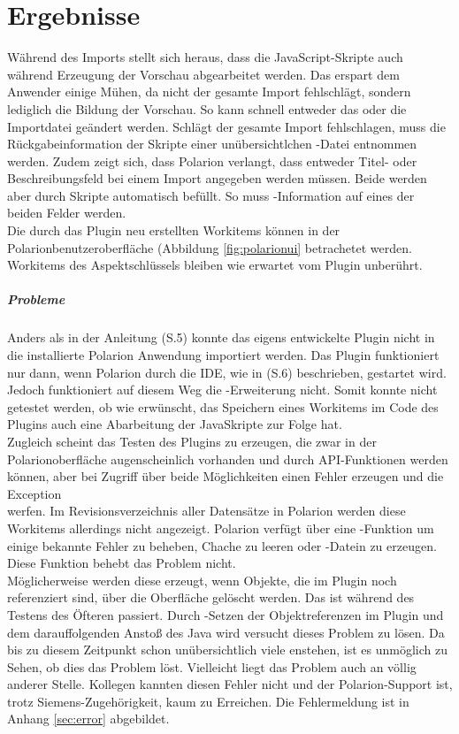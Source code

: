 \chapter{Ergebnisse}
\label{cha:erg}
Während des Imports stellt sich heraus, dass die JavaScript-Skripte auch während Erzeugung der Vorschau abgearbeitet werden. Das erspart dem Anwender einige Mühen, da nicht der gesamte Import fehlschlägt, sondern lediglich die Bildung der Vorschau. So kann schnell entweder das  oder die Importdatei geändert werden. Schlägt der gesamte Import fehlschlagen, muss die Rückgabeinformation der Skripte einer unübersichtlchen -Datei entnommen werden.  
Zudem zeigt sich, dass Polarion verlangt, dass entweder Titel- oder Beschreibungsfeld bei einem Import angegeben werden müssen. Beide werden aber durch Skripte automatisch befüllt. So muss -Information auf eines der beiden Felder  werden.\\
Die durch das Plugin neu erstellten Workitems können in der Polarionbenutzeroberfläche (Abbildung \ref{fig:polarionui} betrachetet werden. Workitems des Aspektschlüssels  bleiben wie erwartet vom Plugin unberührt.
\paragraph{Probleme}
\label{par:prob}
Anders als in der Anleitung \cite{17}(S.5) konnte das eigens entwickelte Plugin nicht in die installierte Polarion Anwendung importiert werden. Das Plugin funktioniert nur dann, wenn Polarion durch die IDE, wie in \cite{17}(S.6) beschrieben, gestartet wird. Jedoch funktioniert auf diesem Weg die -Erweiterung nicht. Somit konnte nicht getestet werden, ob wie erwünscht, das Speichern eines Workitems im Code des Plugins auch eine Abarbeitung der JavaSkripte zur Folge hat.\\
Zugleich scheint das Testen des Plugins  zu erzeugen, die zwar in der Polarionoberfläche augenscheinlich vorhanden und durch API-Funktionen  werden können, aber bei Zugriff über beide Möglichkeiten einen Fehler erzeugen und
die Exception \\  werfen. Im Revisionsverzeichnis aller Datensätze in Polarion werden diese Workitems allerdings nicht angezeigt. Polarion verfügt über eine -Funktion um einige bekannte Fehler zu beheben, Chache zu leeren oder -Datein zu erzeugen. Diese Funktion behebt das Problem nicht.\\
Möglicherweise werden diese erzeugt, wenn Objekte, die im Plugin noch referenziert sind, über die Oberfläche gelöscht werden. Das ist während des Testens des Öfteren passiert. Durch -Setzen der Objektreferenzen im Plugin und dem darauffolgenden Anstoß des Java  wird versucht dieses Problem zu lösen. Da bis zu diesem Zeitpunkt schon unübersichtlich viele  enstehen, ist es unmöglich zu Sehen, ob dies das Problem löst. Vielleicht liegt das Problem auch an völlig anderer Stelle. Kollegen kannten diesen Fehler nicht und der Polarion-Support ist, trotz Siemens-Zugehörigkeit, kaum zu Erreichen. Die Fehlermeldung ist in Anhang \ref{sec:error} abgebildet.
